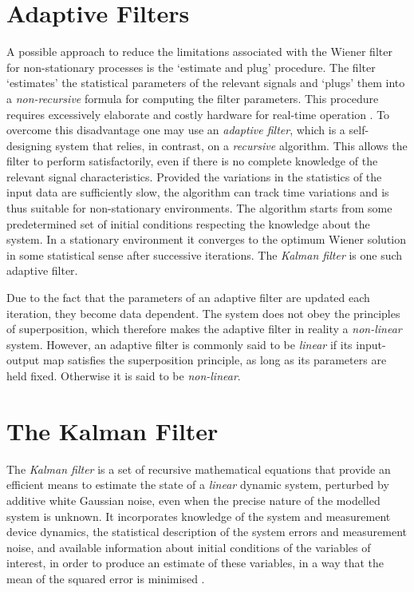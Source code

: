 \section{Adaptive Filters}

A possible approach to reduce the limitations associated with the Wiener filter for non-stationary processes is the `estimate and plug' procedure. The filter `estimates' the statistical parameters of the relevant signals and `plugs' them into a \emph{non-recursive} formula for computing the filter parameters. This procedure requires excessively elaborate and costly hardware for real-time operation \cite{haykin2002adaptive}. To overcome this disadvantage one may use an \emph{adaptive filter}, which is a self-designing system that relies, in contrast, on a \emph{recursive} algorithm. This allows the filter to perform satisfactorily, even if there is no complete knowledge of the relevant signal characteristics. Provided the variations in the  statistics of the input data are sufficiently slow, the algorithm can track time variations and is thus suitable for non-stationary environments. The algorithm starts from some predetermined set of initial conditions respecting the knowledge about the system. In a stationary environment it converges to the optimum Wiener solution in some statistical sense after successive iterations. The \emph{Kalman filter} is one such adaptive filter.

Due to the fact that the parameters of an adaptive filter are updated each iteration, they become data dependent. The system does not obey the principles of superposition, which therefore makes the adaptive filter in reality a \emph{non-linear} system. However, an adaptive filter is commonly said to be \emph{linear} if its input-output map satisfies the superposition principle, as long as its parameters are held fixed. Otherwise it is said to be \emph{non-linear}.

\section{The Kalman Filter}

The \emph{Kalman filter} is a set of recursive mathematical equations that provide an efficient means to estimate the state of a \emph{linear} dynamic system, perturbed by additive white Gaussian noise, even when the precise nature of the modelled system is unknown. It incorporates knowledge of the system and measurement device dynamics, the statistical description of the system errors and measurement noise, and available information about initial conditions of the variables of interest, in order to produce an estimate of these variables, in a way that the mean of the squared error is minimised \cite{Maybeck79}. 

